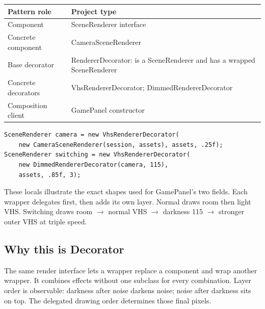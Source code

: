 \documentclass[11pt,a4paper]{article}
\begin{document}
\par\noindent\begin{tabularx}{\linewidth}{L{.26\linewidth}X}\toprule\textbf{Pattern role}&\textbf{Project type}\\\midrule
Component&SceneRenderer interface\\Concrete component&CameraSceneRenderer\\Base decorator&RendererDecorator: is a SceneRenderer and has a wrapped SceneRenderer\\Concrete decorators&VhsRendererDecorator; DimmedRendererDecorator\\Composition client&GamePanel constructor\\\bottomrule\end{tabularx}\par
\begin{lstlisting}
SceneRenderer camera = new VhsRendererDecorator(
    new CameraSceneRenderer(session, assets), assets, .25f);
SceneRenderer switching = new VhsRendererDecorator(
    new DimmedRendererDecorator(camera, 115),
    assets, .85f, 3);
\end{lstlisting}
These locals illustrate the exact shapes used for GamePanel's two fields. Each wrapper delegates first, then adds its own layer. Normal draws room then light VHS. Switching draws room $\rightarrow$ normal VHS $\rightarrow$ darkness 115 $\rightarrow$ stronger outer VHS at triple speed.
\subsection*{Why this is Decorator}
The same render interface lets a wrapper replace a component and wrap another wrapper. It combines effects without one subclass for every combination. Layer order is observable: darkness after noise darkens noise; noise after darkness sits on top. The delegated drawing order determines those final pixels.
\end{document}
